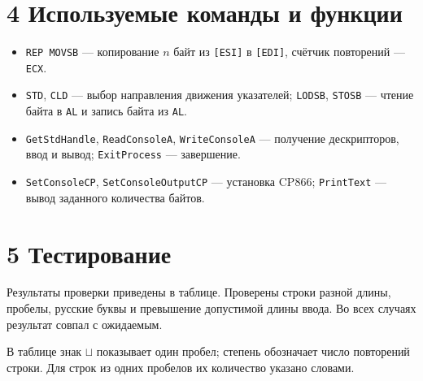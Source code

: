 \documentclass[12pt,a4paper]{article}
\begin{document}
\section*{4 Используемые команды и функции}
\begin{itemize}
\item \texttt{REP MOVSB} --- копирование $n$ байт из \texttt{[ESI]}
в \texttt{[EDI]}, счётчик повторений --- \texttt{ECX}.
\item \texttt{STD}, \texttt{CLD} --- выбор направления движения указателей;
\texttt{LODSB}, \texttt{STOSB} --- чтение байта в \texttt{AL} и запись
байта из \texttt{AL}.
\item \texttt{GetStdHandle}, \texttt{ReadConsoleA}, \texttt{WriteConsoleA}
--- получение дескрипторов, ввод и вывод; \texttt{ExitProcess} --- завершение.
\item \texttt{SetConsoleCP}, \texttt{SetConsoleOutputCP} --- установка CP866;
\texttt{PrintText} --- вывод заданного количества байтов.
\end{itemize}

\section*{5 Тестирование}
Результаты проверки приведены в таблице. Проверены строки разной длины,
пробелы, русские буквы и превышение допустимой длины ввода.
Во всех случаях результат совпал с ожидаемым.

В таблице знак $\sqcup$ показывает один пробел; степень обозначает число
повторений строки. Для строк из одних пробелов их количество указано словами.
\end{document}
